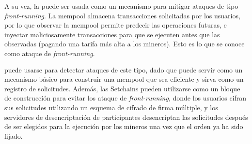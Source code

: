 A su vez, la \setchain puede ser usada como un mecanismo para mitigar ataques de tipo
\textit{front-running}. La mempool almacena transacciones solicitadas por los usuarios,
por lo que observar
la mempool permite predecir las operaciones futuras, e inyectar maliciosamente transacciones
para que se ejecuten antes que las observadas (pagando una tarifa más alta a los mineros).
Esto es lo que se conoce como ataque de \textit{front-running}.


\setchain puede usarse para detectar ataques de este tipo, dado que puede servir
como un
mecanismo básico para construir una mempool que sea eficiente y sirva como un registro de
solicitudes. Además, las Setchains pueden utilizarse como un bloque de construcción para
evitar los ataque de \textit{front-running}, donde los usuarios cifran sus solicitudes
utilizando un esquema de
cifrado de firma múltiple, y los servidores de desencriptación de participantes desencriptan
las solicitudes después de ser elegidos para la ejecución por los mineros una vez que el orden
ya ha sido fijado.
